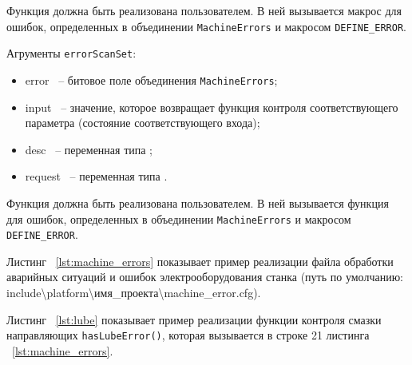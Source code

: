 Функция  должна быть реализована пользователем. В ней
вызывается макрос  для ошибок, 
определенных в объединении \texttt{MachineErrors} и макросом \texttt{DEFINE\_ERROR}. \killoverfullbefore

Агрументы \texttt{errorScanSet}:
\begin{itemize}
\item error ~-- битовое поле объединения \texttt{MachineErrors}; \killoverfullbefore
\item input ~-- значение, которое возвращает функция контроля соответствующего параметра (состояние соответствующего входа); \killoverfullbefore
\item desc ~-- переменная типа ; \killoverfullbefore
\item request ~-- переменная типа . \killoverfullbefore \BL
\end{itemize}

Функция  должна быть реализована пользователем. В ней вызывается функция  для ошибок, определенных в объединении \texttt{MachineErrors} и макросом \texttt{DEFINE\_ERROR}. \killoverfullbefore

Листинг ~\ref{lst:machine_errors} показывает пример реализации файла обработки аварийных ситуаций и ошибок электрооборудования станка (путь по умолчанию: include\textbackslash platform\textbackslash имя\_проекта\textbackslash machine\_error.cfg). \killoverfullbefore \BL


\BL

Листинг ~\ref{lst:lube} показывает пример реализации функции контроля смазки направляющих \texttt{hasLubeError()}, которая вызывается в строке 21 листинга ~\ref{lst:machine_errors}. \killoverfullbefore \BL



\clearpage